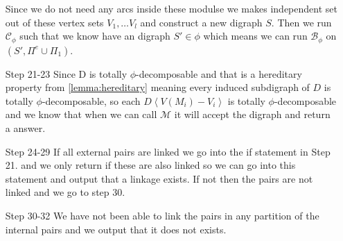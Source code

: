 \begin{itemize}
    Since we do not need any arcs inside these modulse we makes independent set out of these vertex sets $V_1,\dots V_l$ and construct a new digraph $S$. 
    Then we run $\mathcal{C}_\phi$ such that we know have an digraph $S'\in \phi$ which means we can run $\mathcal{B}_\phi$ on $(S',\Pi^e\cup \Pi_1)$.    
    \item[Step 21-23] Since D is totally $\phi$-decomposable and that is a hereditary property from \autoref{lemma:hereditary} meaning every induced subdigraph of $D$ is totally $\phi$-decomposable, so each $D\left< V(M_i)-V_i \right>$ is totally $\phi$-decomposable and we know that when we can call $\mathcal{M}$ it will accept the digraph and return a answer.
    \item[Step 24-29] If all external pairs are linked we go into the if statement in Step 21. and we only return if these are also linked so we can go into this statement and output that a linkage exists. If not then the pairs are not linked and we go to step 30.  
    \item[Step 30-32] We have not been able to link the pairs in any partition of the internal pairs and we output that it does not exists.
\end{itemize}

